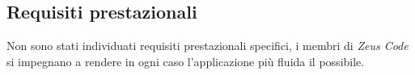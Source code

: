 \subsection{Requisiti prestazionali}

%
%	
%	
%
Non sono stati individuati requisiti prestazionali specifici, i membri di \textit{Zeus Code} si impegnano a rendere in ogni caso l'applicazione più fluida il possibile.
